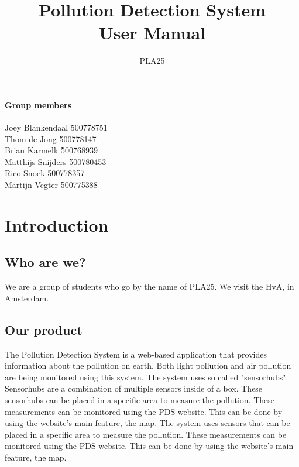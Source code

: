 \documentclass[a4paper]{article}
\title{Pollution Detection System\\User Manual}
\author{PLA25}
\begin{document}
\maketitle
\vspace*{\fill}

\paragraph{Group members}
\begin{tabbing}
	Joey Blankendaal 	\` 	500778751 	\\
	Thom de Jong 		\` 	500778147 	\\
	Brian Karmelk 		\` 	500768939 	\\
	Matthijs Snijders 	\` 	500780453 	\\
	Rico Snoek 			\` 	500778357 	\\
	Martijn Vegter 		\` 	500775388
\end{tabbing}

\thispagestyle{empty}
\pagebreak

\tableofcontents
\pagebreak

\section{Introduction}

\subsection{Who are we?}
We are a group of students who go by the name of PLA25. We visit the HvA, in Amsterdam.

\subsection{Our product}
The Pollution Detection System is a web-based application that provides information about the pollution on earth. Both light pollution and air pollution are being monitored using this system.
\newline
The system uses so called "sensorhubs". Sensorhubs are a combination of multiple sensors inside of a box. These sensorhubs can be placed in a specific area to measure the pollution. These measurements can be monitored using the PDS website. This can be done by using the website's main feature, the map.
The system uses sensors that can be placed in a specific area to measure the pollution. These measurements can be monitored using the PDS website. This can be done by using the website's main feature, the map.
\end{document}
